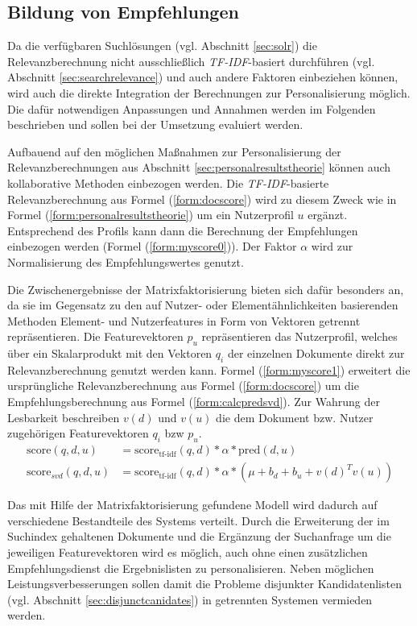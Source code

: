 \subsection{Bildung von Empfehlungen}\label{sec:myrecommend}

Da die verfügbaren Suchlösungen (vgl. Abschnitt \ref{sec:solr}) die Relevanzberechnung nicht ausschließlich \textit{TF-IDF}-basiert durchführen (vgl. Abschnitt \ref{sec:searchrelevance}) und auch andere Faktoren einbeziehen können, wird auch die direkte Integration der Berechnungen zur Personalisierung möglich. Die dafür notwendigen Anpassungen und Annahmen werden im Folgenden beschrieben und sollen bei der Umsetzung evaluiert werden. 

Aufbauend auf den möglichen Maßnahmen zur Personalisierung der Relevanzberechnungen aus Abschnitt  \ref{sec:personalresultstheorie} können auch kollaborative Methoden einbezogen werden. Die \textit{TF-IDF}-basierte Relevanzberechnung aus Formel (\ref{form:docscore}) wird zu diesem Zweck wie in Formel (\ref{form:personalresultstheorie}) um  ein Nutzerprofil $u$ ergänzt. Entsprechend des Profils kann dann die Berechnung der Empfehlungen einbezogen werden (Formel (\ref{form:myscore0})). Der Faktor $\alpha$ wird zur Normalisierung des Empfehlungswertes genutzt.

Die Zwischenergebnisse der Matrixfaktorisierung bieten sich dafür besonders an, da sie im Gegensatz zu den auf Nutzer- oder Elementähnlichkeiten basierenden Methoden Element- und Nutzerfeatures in Form von Vektoren getrennt repräsentieren. Die Featurevektoren $p_u$ repräsentieren das Nutzerprofil, welches über ein Skalarprodukt  mit den Vektoren $q_i$ der einzelnen Dokumente direkt zur Relevanzberechnung genutzt werden kann. Formel (\ref{form:myscore1}) erweitert die ursprüngliche Relevanzberechnung aus Formel (\ref{form:docscore}) um die Empfehlungsberechnung aus Formel (\ref{form:calcpredsvd}). Zur Wahrung der Lesbarkeit beschreiben $v(d)$ und $v(u)$ die dem Dokument bzw. Nutzer zugehörigen Featurevektoren $q_i$ bzw $p_u$.
\begin{align}
\text{score}(q,d,u) & = \text{score}_{\text{tf-idf}}(q,d) * \alpha * \text{pred}(d, u)\label{form:myscore0} \\
\text{score}_{svd}(q,d,u) & = \text{score}_{\text{tf-idf}}(q,d) * \alpha * (\mu + b_d + b_u + v(d)^Tv(u)) \label{form:myscore1}
\end{align}

Das mit Hilfe der Matrixfaktorisierung gefundene Modell wird dadurch auf verschiedene Bestandteile des Systems verteilt. Durch die Erweiterung der im Suchindex gehaltenen Dokumente und die Ergänzung der Suchanfrage um die jeweiligen Featurevektoren wird es möglich, auch ohne einen zusätzlichen Empfehlungsdienst die Ergebnislisten zu personalisieren. Neben möglichen Leistungsverbesserungen sollen damit die Probleme disjunkter Kandidatenlisten (vgl. Abschnitt \ref{sec:disjunctcanidates}) in getrennten Systemen vermieden werden.


